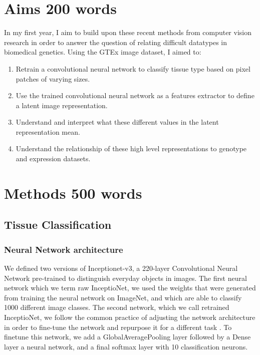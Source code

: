 \documentclass[graybox]{svmult}
\begin{document}
\section{Aims 200 words}
In my first year, I aim to build upon these recent methods from computer vision research in order to answer the question of relating difficult datatypes in biomedical genetics. Using the GTEx image dataset, I aimed to:
\begin{enumerate}
 \item Retrain a convolutional neural network to classify tissue type based on pixel patches of varying sizes.
 \item Use the trained convolutional neural network as a features extractor to define a latent image representation.
 \item Understand and interpret what these different values in the latent representation mean.
 \item Understand the relationship of these high level representations to genotype and expression datasets.
\end{enumerate}
\label{sec:2}

\section{Methods 500 words}

\subsection{Tissue Classification}

\subsubsection{Neural Network architecture}

We defined two versions of Inceptionet-v3, a 220-layer Convolutional Neural Network pre-trained to distinguish everyday objects in images. The first neural network which we term raw InceptioNet, we used the weights that were generated from training the neural network on ImageNet, and which are able to classify 1000 different image classes. The second network, which we call retrained InceptioNet, we follow the common practice of adjusting the network architecture in order to fine-tune the network and repurpose it for a different task \cite{Gando et al.}. To finetune this network, we add a GlobalAveragePooling layer \cite{Lin et al} followed by a Dense layer a neural network, and a final softmax layer with 10 classification neurons.
\end{document}
